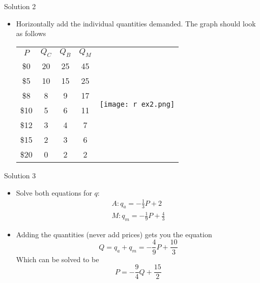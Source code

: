 \documentclass[10pt,xcolor={svgnames}]{beamer}
\begin{document}
\begin{frame}{Solution 2}
    \begin{itemize}
        \item Horizontally add the individual quantities demanded. The graph should look as follows
            \begin{table}[h]
            \centering
            \begin{tabular}{c|c|c||cc}
                $P$ & $Q_{C}$ & $Q_{B}$ & $Q_{M}$ &\multirow{8}{*}{\texttt{[image: r ex2.png]}}\\
                \cline{1-4}
                \$0 & 20 & 25 &45 \\
                \$5 & 10 & 15 &25\\
                \$8 & 8 & 9 & 17\\
                \$10 & 5 & 6 &11\\
                \$12 & 3 & 4 &7\\
                \$15 & 2 & 3 &6\\
                \$20 & 0 & 2 &2
            \end{tabular}
        \end{table}
    \end{itemize}
    \label{Sol2}
\end{frame}

\begin{frame}{Solution 3}
    \begin{itemize}
        \item Solve both equations for $q$:
            \begin{align*}
            A: q_{a}=-\frac{1}{3}P+2\\
            M: q_{m}=-\frac{1}{9}P+\frac{4}{3}
        \end{align*}
        \item Adding the quantities (never add prices) gets you the equation 
        $$Q=q_{a}+q_{m}=-\frac{4}{9}P+\frac{10}{3}$$
        Which can be solved to be 
        $$P=-\frac{9}{4}Q+\frac{15}{2}$$
    \end{itemize}
    \label{Sol3}
\end{frame}
\end{document}
